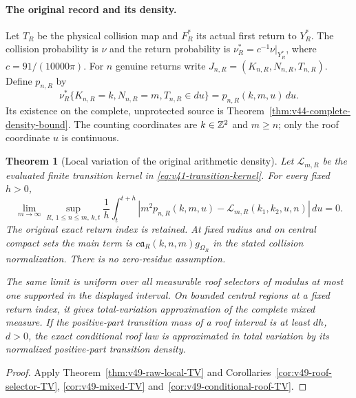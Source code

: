 \documentclass[11pt,reqno]{amsart}
\numberwithin{equation}{section}
\newtheorem{leadtheorem}{Theorem}
\theoremstyle{definition}\newtheorem{definition}[theorem]{Definition}
\theoremstyle{remark}\newtheorem{remark}[theorem]{Remark}
\begin{document}
\paragraph{The original record and its density.}
Let $T_R$ be the physical collision map and $F_R^*$ its actual first
return to $Y_R^*$. The collision probability is $\nu$ and the return
probability is $\nu_R^*=c^{-1}\nu|_{Y_R^*}$, where
$c=91/(10000\pi)$. For $n$ genuine returns write
$J_{n,R}=(K_{n,R},N_{n,R},T_{n,R})$. Define $p_{n,R}$ by
\[
 \nu_R^*\{K_{n,R}=k,N_{n,R}=m,T_{n,R}\in du\}
                  =p_{n,R}(k,m,u)\,du.
\]
Its existence on the complete, unprotected source is
Theorem~\ref{thm:v44-complete-density-bound}. The counting coordinates
are $k\in\mathbb Z^2$ and $m\ge n$; only the roof coordinate $u$ is continuous.

\begin{leadtheorem}[Local variation of the original arithmetic density]
\label{thm:intro-v49-local-TV}
Let $\mathcal L_{m,R}$ be the evaluated finite transition kernel in
\eqref{eq:v41-transition-kernel}. For every fixed $h>0$,
\[
 \lim_{m\to\infty}\sup_{R,\,1\le n\le m,\,k,t}
 \frac1h\int_t^{t+h}
 |m^2p_{n,R}(k,m,u)-\mathcal L_{m,R}(k_1,k_2,u,n)|\,du=0.
\]
The original exact return index is retained. At fixed radius and on
central compact sets the main term is
$c\mathfrak a_R(k,n,m)g_{\Omega_R}$ in the stated collision
normalization. There is no zero-residue assumption.

The same limit is uniform over all measurable roof selectors of
modulus at most one supported in the displayed interval. On bounded
central regions at a fixed return index, it gives total-variation
approximation of the complete mixed measure. If the positive-part
transition mass of a roof interval is at least $dh$, $d>0$, the exact
conditional roof law is approximated in total variation by its
normalized positive-part transition density.
\end{leadtheorem}
\begin{proof}
Apply Theorem~\ref{thm:v49-raw-local-TV} and
Corollaries~\ref{cor:v49-roof-selector-TV}, \ref{cor:v49-mixed-TV}
and~\ref{cor:v49-conditional-roof-TV}.
\end{proof}
\end{document}
